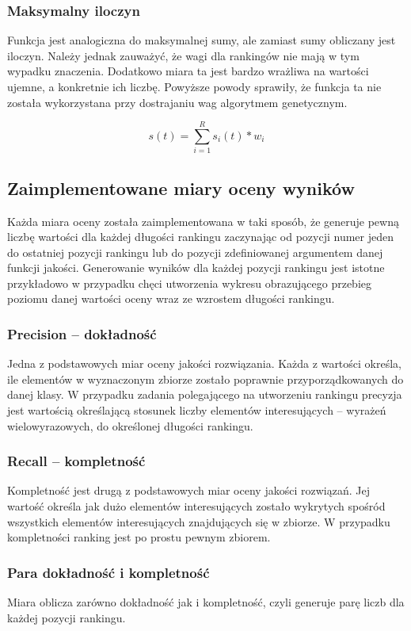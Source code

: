 \subsubsection{Maksymalny iloczyn}
Funkcja jest analogiczna do maksymalnej sumy, ale zamiast sumy obliczany jest iloczyn.
Należy jednak zauważyć, że wagi dla rankingów nie mają w tym wypadku znaczenia.
Dodatkowo miara ta jest bardzo wrażliwa na wartości ujemne, a konkretnie ich liczbę.
Powyższe powody sprawiły, że funkcja ta nie została wykorzystana przy dostrajaniu wag algorytmem genetycznym.

$$ s(t) = \sum_{i=1}^{R} s_{i}(t) * w_{i}$$


\subsection{Zaimplementowane miary oceny wyników}
Każda miara oceny została zaimplementowana w taki sposób, że generuje pewną liczbę wartości dla każdej długości rankingu zaczynając od pozycji numer jeden do ostatniej pozycji rankingu lub do pozycji zdefiniowanej argumentem danej funkcji jakości.
Generowanie wyników dla każdej pozycji rankingu jest istotne przykładowo w przypadku chęci utworzenia wykresu obrazującego przebieg poziomu danej wartości oceny wraz ze wzrostem długości rankingu.

\subsubsection{Precision -- dokładność}
Jedna z podstawowych miar oceny jakości rozwiązania.
Każda z wartości określa, ile elementów w wyznaczonym zbiorze zostało poprawnie przyporządkowanych do danej klasy.
W przypadku zadania polegającego na utworzeniu rankingu precyzja jest wartością określającą stosunek liczby elementów interesujących -- wyrażeń wielowyrazowych, do określonej długości rankingu.

\subsubsection{Recall -- kompletność}
Kompletność jest drugą z podstawowych miar oceny jakości rozwiązań.
Jej wartość określa jak dużo elementów interesujących zostało wykrytych spośród wszystkich elementów interesujących znajdujących się w zbiorze.
W przypadku kompletności ranking jest po prostu pewnym zbiorem.

\subsubsection{Para dokładność i kompletność}
Miara oblicza zarówno dokładność jak i kompletność, czyli generuje parę liczb dla każdej pozycji rankingu.

